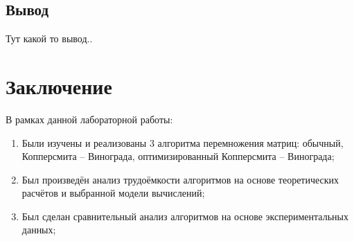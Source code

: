 \documentclass[12pt]{report}
\begin{document}
\section{Вывод}

Тут какой то вывод..

\chapter*{Заключение}

В рамках данной лабораторной работы:

\begin{enumerate}

	\item Были изучены и реализованы 3 алгоритма перемножения матриц: обычный, Копперсмита -- Винограда, оптимизированный Копперсмита -- Винограда;

	\item Был произведён анализ трудоёмкости алгоритмов на основе теоретических расчётов и выбранной модели вычислений;

	\item Был сделан сравнительный анализ алгоритмов на основе экспериментальных данных;

\end{enumerate}





\end{document}
